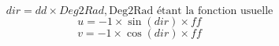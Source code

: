 \\
\begin{equation*}
 dir = dd \times Deg2Rad, 
  \text{Deg2Rad \'etant la fonction usuelle}
\end{equation*}
\begin{equation*}
u = -1 \times \sin (dir) \times ff
\end{equation*}
\begin{equation*}
v = -1 \times \cos (dir) \times ff
\end{equation*}


